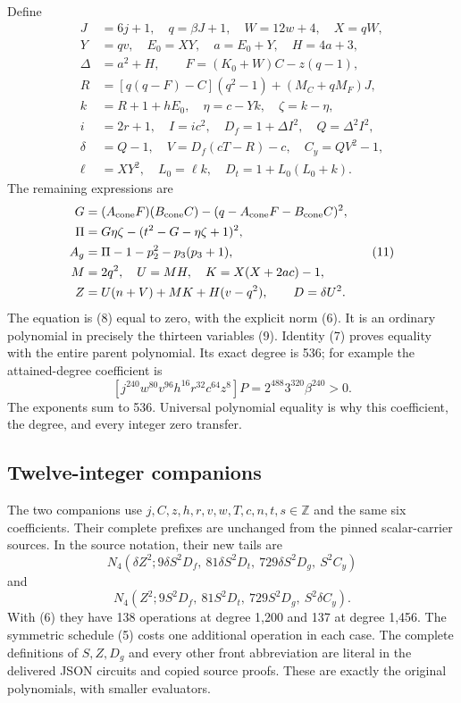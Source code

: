 \documentclass[11pt]{article}
\theoremstyle{remark}
\newcommand{\Z}{\mathbb Z}
\begin{document}
Define
\[
\begin{aligned}
J&=6j+1,\quad q=\beta J+1,\quad W=12w+4,\quad X=qW,\\
Y&=qv,\quad E_0=XY,\quad a=E_0+Y,\quad H=4a+3,\\
\Delta&=a^2+H,\qquad F=(K_0+W)C-z(q-1),\\
R&=[q(q-F)-C](q^2-1)+(M_C+qM_F)J,\\
k&=R+1+hE_0,\quad\eta=c-Yk,\quad\zeta=k-\eta,\\
i&=2r+1,\quad I=ic^2,\quad D_f=1+\Delta I^2,\quad Q=\Delta^2I^2,\\
\delta&=Q-1,\quad V=D_f(cT-R)-c,\quad C_y=QV^2-1,\\
\ell&=XY^2,\quad L_0=\ell k,\quad D_t=1+L_0(L_0+k).
\end{aligned}
\tag{10}
\]
The remaining expressions are
\[
\begin{aligned}
G&=(A_{\rm cone}F)(B_{\rm cone}C)
 -(q-A_{\rm cone}F-B_{\rm cone}C)^2,\\
\Pi&=G\eta\zeta-(t^2-G-\eta\zeta+1)^2,\\
A_g&=\Pi-1-p_2^2-p_3(p_3+1),\\
M&=2q^2,\quad U=MH,\quad K=X(X+2ac)-1,\\
Z&=U(n+V)+MK+H(v-q^2),\qquad D=\delta U^2.
\end{aligned}
\tag{11}
\]
The equation is (8) equal to zero, with the explicit norm (6).
It is an ordinary polynomial in precisely the thirteen variables (9).
Identity (7) proves equality with the entire parent polynomial.
Its exact degree is 536; for example the attained-degree coefficient is
\[
[j^{240}w^{80}v^{96}h^{16}r^{32}c^{64}z^8]P
=2^{488}3^{320}\beta^{240}>0.
\tag{12}
\]
The exponents sum to 536. Universal polynomial equality is why this
coefficient, the degree, and every integer zero transfer.

\subsection{Twelve-integer companions}

The two companions use $j,C,z,h,r,v,w,T,c,n,t,s\in\Z$ and the same
six coefficients. Their complete prefixes are unchanged from the pinned
scalar-carrier sources. In the source notation, their new tails are
\[
N_4(\delta Z^2;
9\delta S^2D_f,\ 81\delta S^2D_t,\ 729\delta S^2D_g,\ S^2C_y)
\tag{13}
\]
and
\[
N_4(Z^2;9S^2D_f,\ 81S^2D_t,\ 729S^2D_g,\ S^2\delta C_y).
\tag{14}
\]
With (6) they have 138 operations at degree 1,200 and 137 at degree 1,456.
The symmetric schedule (5) costs one additional operation in each case.
The complete definitions of $S,Z,D_g$ and every other front abbreviation
are literal in the delivered JSON circuits and copied source proofs.
These are exactly the original polynomials, with smaller evaluators.
\end{document}
